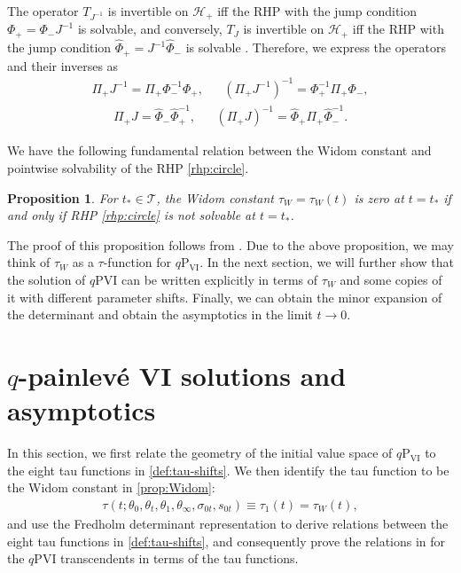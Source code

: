 \documentclass[a4paper,reqno,11pt]{amsart}
\numberwithin{equation}{section}
\numberwithin{figure}{section}
\theoremstyle{plain}
\newtheorem{proposition}[theorem]{Proposition}
\theoremstyle{remark}
\newcommand\Psix{\textrm{P}_{\textrm{VI}}}
\newcounter{rhp}
\numberwithin{rhp}{section}
\begin{document}
The operator $T_{J^{-1}}$ is invertible on $\mathcal{H}_{+}$ iff the RHP with the jump condition $\Phi_{+} = \Phi_{-} J^{-1}$ is solvable, and conversely,  $T_{J}$ is invertible on $\mathcal{H}_{+}$ iff the RHP with the jump condition $\widehat{\Phi}_{+} = J^{-1} \widehat{\Phi}_{-}$ is solvable \cite{WIDOM19761,CGL2017}. Therefore, we express the operators and their inverses as
\begin{align}
  \Pi_{+} J^{-1} = \Pi_{+} \Phi_{-}^{-1} \Phi_{+}, &&  \left(\Pi_{+} J^{-1} \right)^{-1} = \Phi_{+}^{-1}\Pi_{+} \Phi_{-}, \label{eq:TopInv}
\end{align}
\begin{align}
  \Pi_{+} J = \widehat{\Phi}_{-} \widehat{\Phi}_{+}^{-1} , &&  \left(\Pi_{+} J \right)^{-1} = \widehat{\Phi}_{+} \Pi_{+} \widehat{\Phi}_{-}^{-1}. \label{eq:BotInv}
\end{align}




We have the following fundamental relation between the Widom constant and pointwise solvability of the RHP \ref{rhp:circle}.
\begin{proposition}\label{prop:solvabilitytau}
    For $t_*\in \mathcal{T}$, the Widom constant $\tau_W=\tau_W(t)$ is zero at $t=t_*$ if and only if RHP \ref{rhp:circle} is not solvable at $t=t_*$.
\end{proposition}
The proof of this proposition follows from \cite[Theorem 2.2]{bertola2017malgrange}. Due to the above proposition, we may think of $\tau_W$ as a $\tau$-function for $q\Psix$. In the next section, we will further show that the  solution of $q$PVI can be written explicitly in terms of $\tau_W$ and some copies of it with different parameter shifts. Finally, we can obtain the minor expansion of the determinant and obtain the asymptotics in the limit $t\to 0$. 







%

\section{$q$-painlev\'e VI solutions and asymptotics}\label{sec:sol-asymp}
In this section, we first relate the geometry of the initial value space of $q\Psix$ to the eight tau functions in \eqref{def:tau-shifts}. We then identify the tau function to be the Widom constant in \eqref{prop:Widom}:
\begin{align}\label{eq:all-taus-are-the-same}
 \tau(t;\theta_0, \theta_t, \theta_{1}, \theta_{\infty}, \sigma_{0t}, s_{0t} ) \equiv \tau_1(t) = \tau_W(t),
\end{align}
and use the Fredholm determinant representation to derive relations between the eight tau functions in \eqref{def:tau-shifts}, and consequently prove the relations in \cite[Theorem 3.3]{JNS2017} for the $q$PVI transcendents in terms of the tau functions. 
\end{document}
